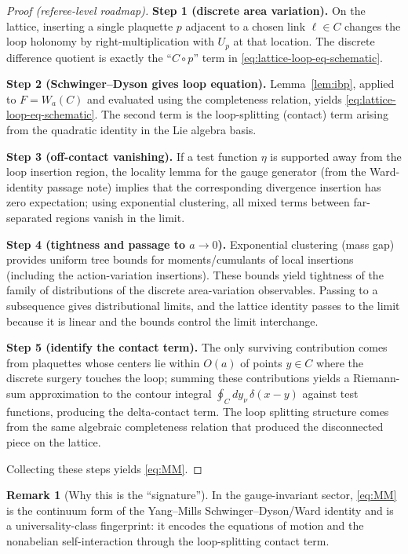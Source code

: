 \documentclass[11pt]{article}
\theoremstyle{definition}
\newtheorem{remark}[theorem]{Remark}
\newcommand{\1}{\mathbf{1}}
\begin{document}
\begin{proof}[Proof (referee-level roadmap)]
\textbf{Step 1 (discrete area variation).} On the lattice, inserting a single plaquette $p$ adjacent to a chosen link $\ell\in C$ changes the loop holonomy by right-multiplication with $U_p$ at that location. The discrete difference quotient is exactly the ``$C\circ p$'' term in \eqref{eq:lattice-loop-eq-schematic}.

\textbf{Step 2 (Schwinger--Dyson gives loop equation).} Lemma~\ref{lem:ibp}, applied to $F=W_a(C)$ and evaluated using the completeness relation, yields \eqref{eq:lattice-loop-eq-schematic}. The second term is the loop-splitting (contact) term arising from the quadratic identity in the Lie algebra basis.

\textbf{Step 3 (off-contact vanishing).} If a test function $\eta$ is supported away from the loop insertion region, the locality lemma for the gauge generator (from the Ward-identity passage note) implies that the corresponding divergence insertion has zero expectation; using exponential clustering, all mixed terms between far-separated regions vanish in the limit.

\textbf{Step 4 (tightness and passage to $a\to 0$).} Exponential clustering (mass gap) provides uniform tree bounds for moments/cumulants of local insertions (including the action-variation insertions). These bounds yield tightness of the family of distributions of the discrete area-variation observables. Passing to a subsequence gives distributional limits, and the lattice identity passes to the limit because it is linear and the bounds control the limit interchange.

\textbf{Step 5 (identify the contact term).} The only surviving contribution comes from plaquettes whose centers lie within $O(a)$ of points $y\in C$ where the discrete surgery touches the loop; summing these contributions yields a Riemann-sum approximation to the contour integral $\oint_C dy_\nu\,\delta(x-y)$ against test functions, producing the delta-contact term. The loop splitting structure comes from the same algebraic completeness relation that produced the disconnected piece on the lattice.

Collecting these steps yields \eqref{eq:MM}.
\end{proof}

\begin{remark}[Why this is the ``signature'']
In the gauge-invariant sector, \eqref{eq:MM} is the continuum form of the Yang--Mills Schwinger--Dyson/Ward identity and is a universality-class fingerprint: it encodes the equations of motion and the nonabelian self-interaction through the loop-splitting contact term.
\end{remark}
\end{document}
